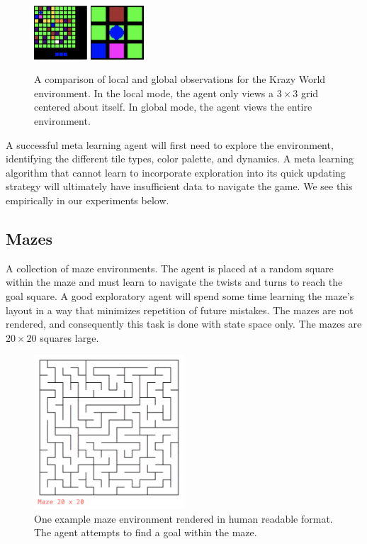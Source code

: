 \documentclass{article} %
\begin{document}
\begin{enumerate}
    \begin{figure}[ht]
    \begin{center}
    \includegraphics[height=20mm]{envs/grid_0.png} %
    \includegraphics[height=20mm]{envs/grid_local.png}  
    \end{center}
    \caption{A comparison of local and global observations for the Krazy World environment. In the local mode, the agent only views a $3 \times 3$ grid centered about itself. In global mode, the agent views the entire environment.}
    \end{figure} 
\end{enumerate}
    
A successful meta learning agent will first need to explore the environment, identifying the different tile types, color palette, and dynamics. A meta learning algorithm that cannot learn to incorporate exploration into its quick updating strategy will ultimately have insufficient data to navigate the game. We see this empirically in our experiments below. 

    
\subsection{Mazes}
A collection of maze environments. The agent is placed at a random square within the maze and must learn to navigate the twists and turns to reach the goal square. A good exploratory agent will spend some time learning the maze's layout in a way that minimizes repetition of future mistakes. The mazes are not rendered, and consequently this task is done with state space only. The mazes are $20 \times 20$ squares large.   
\begin{figure}[ht]
\begin{center}
\includegraphics[width=0.5\textwidth]{envs/maze_screenshot.png} 
\end{center}
\caption{One example maze environment rendered in human readable format. The agent attempts to find a goal within the maze.}
\end{figure} 
\end{document}
